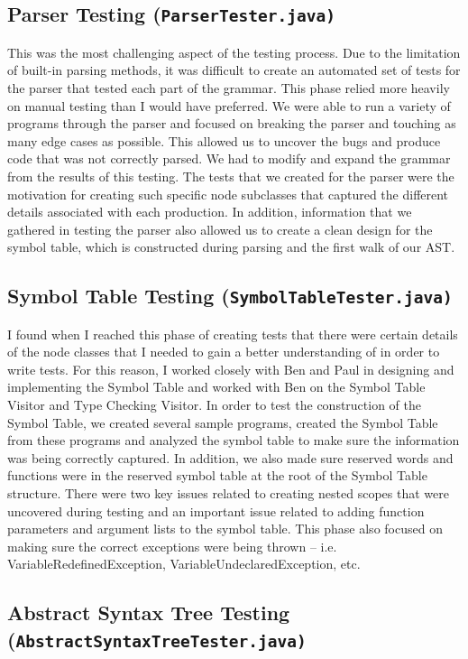 \documentclass{book}
\begin{document}
\subsection*{Parser Testing (\tt ParserTester.java\rm)}

This was the most challenging aspect of the testing process. Due to the limitation of built-in parsing methods, it was difficult to create an automated set of tests for the parser that tested each part of the grammar. This phase relied more heavily on manual testing than I would have preferred. We were able to run a variety of programs through the parser and focused on breaking the parser and touching as many edge cases as possible. This allowed us to uncover the bugs and produce code that was not correctly parsed. We had to modify and expand the grammar from the results of this testing. The tests that we created for the parser were the motivation for creating such specific node subclasses that captured the different details associated with each production. In addition, information that we gathered in testing the parser also allowed us to create a clean design for the symbol table, which is constructed during parsing and the first walk of our AST.

\subsection*{Symbol Table Testing (\tt SymbolTableTester.java\rm)}
I found when I reached this phase of creating tests that there were certain details of the node classes that I needed to gain a better understanding of in order to write tests. For this reason, I worked closely with Ben and Paul in designing and implementing the Symbol Table and worked with Ben on the Symbol Table Visitor and Type Checking Visitor. In order to test the construction of the Symbol Table, we created several sample programs, created the Symbol Table from these programs and analyzed the symbol table to make sure the information was being correctly captured. In addition, we also made sure reserved words and functions were in the reserved symbol table at the root of the Symbol Table structure. There were two key issues related to creating nested scopes that were uncovered during testing and an important issue related to adding function parameters and argument lists to the symbol table. This phase also focused on making sure the correct exceptions were being thrown – i.e. VariableRedefinedException, VariableUndeclaredException, etc.

\subsection*{Abstract Syntax Tree Testing (\tt AbstractSyntaxTreeTester.java\rm)}
\end{document}
